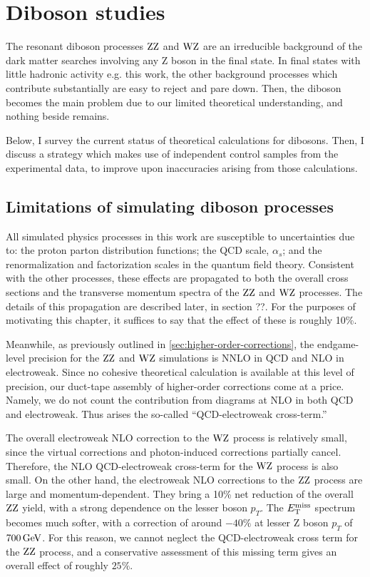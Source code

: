 \chapter{Diboson studies}
\label{chap:dibosons}

The resonant diboson processes $\mathrm{Z}\mathrm{Z}$ and $\mathrm{W}\mathrm{Z}$ are an irreducible background of the
dark matter searches involving any Z boson in the final state.
In final states with little hadronic activity e.g. this work, 
the other background processes which contribute substantially are easy to reject and pare down.
Then, the diboson becomes the main problem due to our limited theoretical understanding, and nothing beside remains.

Below, I survey the current status of theoretical calculations for dibosons. 
Then, I discuss a strategy which makes use of independent control samples from the experimental data,
to improve upon inaccuracies arising from those calculations.

\section{Limitations of simulating diboson processes}
\label{sec:vvtheo}
All simulated physics processes in this work are susceptible to uncertainties due to: the proton parton distribution functions; the QCD scale, $\alpha_s$; and the renormalization and factorization scales in the quantum field theory.
Consistent with the other processes, these effects are propagated to both the overall cross sections and the transverse momentum spectra of the $\mathrm{Z}\mathrm{Z}$ and $\mathrm{W}\mathrm{Z}$ processes.
The details of this propagation are described later, in section ??.
For the purposes of motivating this chapter, it suffices to say that the effect of these is roughly 10\%. 

Meanwhile, as previously outlined in \ref{sec:higher-order-corrections}, the endgame-level precision for the $\mathrm{Z}\mathrm{Z}$ and $\mathrm{W}\mathrm{Z}$ simulations is NNLO in QCD and NLO in electroweak.
Since no cohesive theoretical calculation is available at this level of precision, our duct-tape assembly of higher-order corrections come at a price.
Namely, we do not count the contribution from diagrams at NLO in both QCD and electroweak. Thus arises the so-called ``QCD-electroweak cross-term.''

The overall electroweak NLO correction to the $\mathrm{W}\mathrm{Z}$ process is relatively small, since the virtual corrections and photon-induced corrections partially cancel.
Therefore, the NLO QCD-electroweak cross-term for the $\mathrm{W}\mathrm{Z}$ process is also small.
On the other hand, the electroweak NLO corrections to the $\mathrm{Z}\mathrm{Z}$ process are large and momentum-dependent.
They bring a 10\% net reduction of the overall $\mathrm{Z}\mathrm{Z}$ yield, with a strong dependence on the lesser boson $p_T$.
The $E_\mathrm{T}^{\mathrm{miss}}$ spectrum becomes much softer, with a correction of around $-40\%$ at lesser Z boson $p_T$ of $700 \,\text{Ge\hspace{-.08em}V}$.
For this reason, we cannot neglect the QCD-electroweak cross term for the $\mathrm{Z}\mathrm{Z}$ process, and a conservative
assessment of this missing term gives an overall effect of roughly $25\%$.

